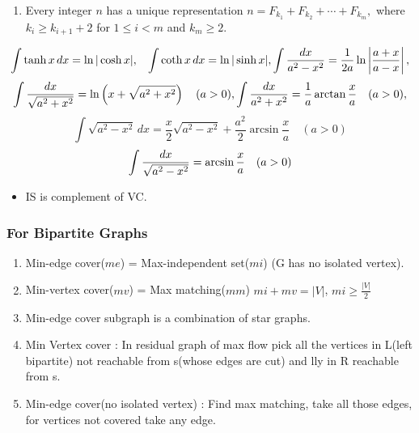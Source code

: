 \documentclass[12pt]{extarticle}
\begin{document}
\begin{multicols*}{2}
\begin{enumerate}
		\item Every integer $n$ has a unique representation
		$ n = F_{k_1} + F_{k_2} + \cdots + F_{k_m},$
		where $k_i \geq k_{i+1} + 2$ for $1 \leq i < m$ and $k_m \geq 2$.
		\end{enumerate}
	
	$$\int \tanh x \, dx = \ln \vert \cosh x \vert, \hspace{3mm}
	\int \coth x \, dx = \ln \vert \sinh x \vert, \int {dx  \over a^2 - x^2} = {1 \over 2a} \ln\left\vert{a + x \over a - x}\right\vert, $$
	$$ \int {dx  \over \sqrt{a^2 + x^2}}= \ln \left(x + \sqrt{a^2 + x^2}\right) \quad (a > 0), \int {dx  \over a^2 + x^2}= \frac 1 a \arctan \frac x a \quad (a > 0), $$
	$$ \int \sqrt{a^2 - x^2} \, dx = \frac x 2 \sqrt{a^2 - x^2} + \frac{a^2}{2} \arcsin \frac x a \quad (a > 0) $$ $$\int {dx  \over \sqrt{a^2 - x^2}} = \arcsin \frac x a \quad (a > 0) $$
	
	\begin{itemize}
		\item IS is complement of VC.
	\end{itemize}
	\subsubsection*{For Bipartite Graphs}
	\begin{enumerate}
		\item Min-edge cover($me$) = Max-independent set($mi$) (G has no isolated vertex).
		\item Min-vertex cover($mv$) = Max matching($mm$) \hspace{5mm} $mi + mv = |V|$,\hspace{5mm} $mi \geq \frac{|V|}{2}$
		\item Min-edge cover subgraph is a combination of star graphs.
		\item Min Vertex cover : In residual graph of max flow pick all the vertices in 
		L(left bipartite) not reachable from s(whose edges are cut) and lly in R reachable from s.
		\item Min-edge cover(no isolated vertex) : Find max matching, take all those edges, for vertices not covered
		take any edge.
	\end{enumerate}
		\end{multicols*}
\end{document}
